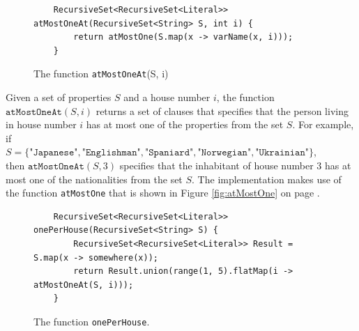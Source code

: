 \begin{figure}[!ht]
\centering
\begin{verbatim}
    RecursiveSet<RecursiveSet<Literal>> atMostOneAt(RecursiveSet<String> S, int i) {
        return atMostOne(S.map(x -> varName(x, i)));
    }
\end{verbatim}
\vspace*{-0.3cm}
\caption{The function \texttt{atMostOneAt}(S, i)}
\label{fig:atMostOneAt}
\end{figure}

Given a set of properties $S$ and a house number $i$, the function
$\texttt{atMostOneAt}(S, i)$ returns a set of clauses that specifies that the
person living in house number $i$ has at most one of the properties from the set
$S$.  For example, if  
\\[0.2cm]
\hspace*{1.3cm}
$S = \{\texttt{"Japanese"}, \texttt{"Englishman"}, \texttt{"Spaniard"}, \texttt{"Norwegian"}, \texttt{"Ukrainian"}\}$,
\\[0.2cm]
then $\texttt{atMostOneAt}(S, 3)$ specifies that the inhabitant of house number 3
has at most one of the nationalities from the set $S$.   The implementation
makes use of the function \texttt{atMostOne} that is shown in Figure
\ref{fig:atMostOne} on page \pageref{fig:atMostOne}.

\begin{figure}[!ht]
\centering
\begin{verbatim}
    RecursiveSet<RecursiveSet<Literal>> onePerHouse(RecursiveSet<String> S) {
        RecursiveSet<RecursiveSet<Literal>> Result = S.map(x -> somewhere(x));
        return Result.union(range(1, 5).flatMap(i -> atMostOneAt(S, i)));
    }
\end{verbatim}
\vspace*{-0.3cm}
\caption{The function \texttt{onePerHouse}.}
\label{fig:onePerHouse}
\end{figure}

